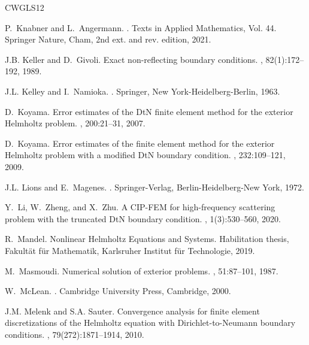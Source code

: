 \documentclass[12pt,DIV=14]{scrartcl}
\renewenvironment{thebibliography}[1]{
\begin{oldthebibliography}{#1}
\setlength{\itemsep}{0em}
\setlength{\parskip}{0em}
}
{
\end{oldthebibliography}
}
\begin{document}
\begin{thebibliography}{CWGLS12}
P.~Knabner and L.~Angermann.
.
\newblock Texts in Applied Mathematics, Vol. 44. Springer Nature, Cham, 2nd
  ext. and rev. edition, 2021.

J.B. Keller and D.~Givoli.
\newblock Exact non-reflecting boundary conditions.
, 82(1):172--192, 1989.

J.L. Kelley and I.~Namioka.
.
\newblock Springer, New York-Heidelberg-Berlin, 1963.

D.~Koyama.
\newblock Error estimates of the {DtN} finite element method for the exterior
  {H}elmholtz problem.
, 200:21--31, 2007.

D.~Koyama.
\newblock Error estimates of the finite element method for the exterior
  {H}elmholtz problem with a modified {DtN} boundary condition.
, 232:109--121, 2009.

J.L. Lions and E.~Magenes.
.
\newblock Springer-Verlag, Berlin-Heidelberg-New York, 1972.

Y.~Li, W.~Zheng, and X.~Zhu.
\newblock A {CIP-FEM} for high-frequency scattering problem with the truncated
  {DtN} boundary condition.
, 1(3):530--560, 2020.

R.~Mandel.
\newblock Nonlinear {H}elmholtz {E}quations and {S}ystems.
\newblock Habilitation thesis, Fakult\"{a}t f\"{u}r Mathematik, Karlsruher
  Institut f\"{u}r Technologie, 2019.

M.~Masmoudi.
\newblock Numerical solution of exterior problems.
, 51:87--101, 1987.

W.~McLean.
.
\newblock Cambridge University Press, Cambridge, 2000.

J.M. Melenk and S.A. Sauter.
\newblock Convergence analysis for finite element discretizations of the
  {H}elmholtz equation with {D}irichlet-to-{N}eumann boundary conditions.
, 79(272):1871--1914, 2010.


\end{thebibliography}
\end{document}
